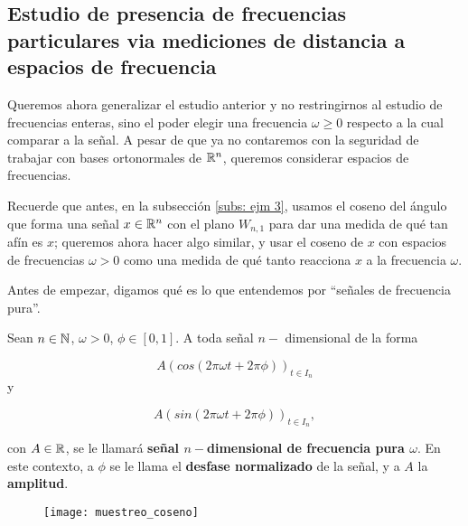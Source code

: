 \subsection{Estudio de presencia de frecuencias particulares via mediciones de distancia a espacios de frecuencia}

Queremos ahora generalizar el estudio anterior y no restringirnos
al estudio de frecuencias enteras, 
sino el poder elegir una frecuencia $\omega \geq 0$ respecto
a la cual comparar a la señal. A pesar
de que ya no contaremos con la seguridad de trabajar con bases
ortonormales de $\mathbb{R}^{n}$, queremos considerar espacios de frecuencias.

Recuerde que antes, en la subsección \ref{subs: ejm 3},
usamos el coseno del ángulo que forma una señal $x \in \mathbb{R}^{n}$
con el plano $W_{n,1}$ para dar una medida de qué tan afín es $x$;
queremos ahora hacer algo similar, y usar el coseno de $x$ con espacios
de frecuencias $\omega >0$ como
una medida de qué tanto reacciona $x$ a la frecuencia $\omega$.


Antes de empezar, 
digamos qué es lo que 
entendemos por ``señales de frecuencia pura''.
\begin{defi}
Sean $n \in \mathbb{N}$,  $\omega>0$, $\phi \in [0,1]$.  A toda señal $n-$
dimensional  
de la forma

\begin{equation}
A \left(
cos \left(  2 \pi \omega t + 2 \pi \phi
\right)
\right)_{t \in I_{n}}
\end{equation}
y

\begin{equation}
A \left(
sin \left(  2 \pi \omega t + 2 \pi \phi
\right)
\right)_{t \in I_{n}},
\end{equation}

\noindent
con $A \in \mathbb{R}$, se le llamará
\textbf{señal $n-$dimensional de frecuencia
pura $\omega$}. En este contexto,
a $\phi$ se le llama el \textbf{desfase normalizado}
de la señal, y a $A$ la \textbf{amplitud}.
\end{defi}

\begin{figure}[H]
	\centering
	\texttt{[image: muestreo\_coseno]} 
\end{figure}	



